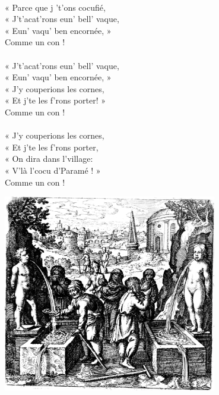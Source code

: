 \\« Parce que j 't'ons cocufié,
\\« J't'acat'rons eun' bell' vaque,
\\« Eun' vaqu' ben encornée, »
\\Comme un con !
\\\\« J't'acat'rons eun' bell' vaque,
\\« Eun' vaqu' ben encornée, »
\\« J'y couperions les cornes,
\\« Et j'te les f'rons porter! »
\\Comme un con !
\\\\« J'y couperions les cornes,
\\« Et j'te les f'rons porter,
\\« On dira dans l'village:
\\« V'là l'cocu d'Paramé ! »
\\Comme un con ! 
\bigskip
\begin{center}
   \includegraphics[width=0.7\textwidth]{images/brev42.png}
 \end{center}
 
\breakpage